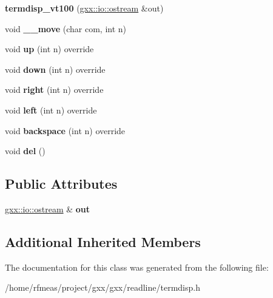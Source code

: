 \begin{DoxyCompactItemize}
\item 
{\bfseries termdisp\+\_\+vt100} (\hyperlink{classgxx_1_1io_1_1ostream}{gxx\+::io\+::ostream} \&out)\hypertarget{classgxx_1_1termdisp__vt100_a701a08fca61423ed8fd2a87bb771d76f}{}\label{classgxx_1_1termdisp__vt100_a701a08fca61423ed8fd2a87bb771d76f}

\item 
void {\bfseries \+\_\+\+\_\+move} (char com, int n)\hypertarget{classgxx_1_1termdisp__vt100_a7c3401c8eb80b9b1b277b7b1d909542f}{}\label{classgxx_1_1termdisp__vt100_a7c3401c8eb80b9b1b277b7b1d909542f}

\item 
void {\bfseries up} (int n) override\hypertarget{classgxx_1_1termdisp__vt100_a3f0d8c7d45e2af747d526bb40514bafc}{}\label{classgxx_1_1termdisp__vt100_a3f0d8c7d45e2af747d526bb40514bafc}

\item 
void {\bfseries down} (int n) override\hypertarget{classgxx_1_1termdisp__vt100_af97c9c54b264ff7f62c3f7a71f8c2cb7}{}\label{classgxx_1_1termdisp__vt100_af97c9c54b264ff7f62c3f7a71f8c2cb7}

\item 
void {\bfseries right} (int n) override\hypertarget{classgxx_1_1termdisp__vt100_aaea090151e1bc12c2b2931250c43bbac}{}\label{classgxx_1_1termdisp__vt100_aaea090151e1bc12c2b2931250c43bbac}

\item 
void {\bfseries left} (int n) override\hypertarget{classgxx_1_1termdisp__vt100_ad4b589c83c3907e988b1bfb1c96ba208}{}\label{classgxx_1_1termdisp__vt100_ad4b589c83c3907e988b1bfb1c96ba208}

\item 
void {\bfseries backspace} (int n) override\hypertarget{classgxx_1_1termdisp__vt100_adf513e0af774403fbdb8b288fb47777e}{}\label{classgxx_1_1termdisp__vt100_adf513e0af774403fbdb8b288fb47777e}

\item 
void {\bfseries del} ()\hypertarget{classgxx_1_1termdisp__vt100_acb8f4b2b32c80307e2a6b44c9b96901f}{}\label{classgxx_1_1termdisp__vt100_acb8f4b2b32c80307e2a6b44c9b96901f}

\end{DoxyCompactItemize}
\subsection*{Public Attributes}
\begin{DoxyCompactItemize}
\item 
\hyperlink{classgxx_1_1io_1_1ostream}{gxx\+::io\+::ostream} \& {\bfseries out}\hypertarget{classgxx_1_1termdisp__vt100_a453bbd58c84c16ee80eb75f47c01ac0d}{}\label{classgxx_1_1termdisp__vt100_a453bbd58c84c16ee80eb75f47c01ac0d}

\end{DoxyCompactItemize}
\subsection*{Additional Inherited Members}


The documentation for this class was generated from the following file\+:\begin{DoxyCompactItemize}
\item 
/home/rfmeas/project/gxx/gxx/readline/termdisp.\+h\end{DoxyCompactItemize}
